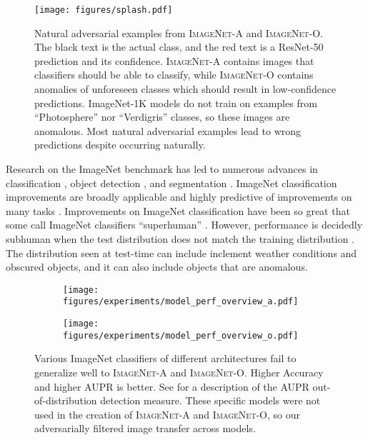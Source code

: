 \documentclass[10pt,twocolumn,letterpaper]{article}
\begin{document}
\begin{figure}[t]
\centering
    \texttt{[image: figures/splash.pdf]}
\caption{Natural adversarial examples from \textsc{ImageNet-A} and \textsc{ImageNet-O}. The black text is the actual class, and the red text is a ResNet-50 prediction and its confidence. \textsc{ImageNet-A} contains images that classifiers should be able to classify, while \textsc{ImageNet-O} contains anomalies of unforeseen classes which should result in low-confidence predictions. ImageNet-1K models do not train on examples from ``Photosphere'' nor ``Verdigris'' classes, so these images are anomalous. Most natural adversarial examples lead to wrong predictions despite occurring naturally.
}\label{fig:splash}
\vspace{-10pt}
\end{figure}

Research on the ImageNet \cite{imagenet} benchmark has led to numerous advances in classification \cite{AlexNet}, object detection \cite{Huang2017SpeedAccuracyTF}, and segmentation \cite{He2018MaskR}. ImageNet classification improvements are broadly applicable and highly predictive of improvements on many tasks \cite{Kornblith2018DoBI}. Improvements on ImageNet classification have been so great that some call ImageNet classifiers ``superhuman'' \cite{He2015DelvingDI}.
However, performance is decidedly subhuman when the test distribution does not match the training distribution \cite{hendrycks2019robustness}. The distribution seen at test-time can include inclement weather conditions and obscured objects, and it can also include objects that are anomalous.

\begin{figure*}[t]
\vspace{-10pt}
\centering
\begin{subfigure}{.5\textwidth}
\texttt{[image: figures/experiments/model\_perf\_overview\_a.pdf]}
\end{subfigure}\begin{subfigure}{.5\textwidth}
\texttt{[image: figures/experiments/model\_perf\_overview\_o.pdf]}
\end{subfigure}
\caption{
Various ImageNet classifiers of different architectures fail to generalize well to \textsc{ImageNet-A} and \textsc{ImageNet-O}.
Higher Accuracy and higher AUPR is better. See  for a description of the AUPR out-of-distribution detection measure. These specific models were not used in the creation of \textsc{ImageNet-A} and \textsc{ImageNet-O}, so our adversarially filtered image transfer across models. 
}\label{fig:modelsono}
\vspace{-10pt}
\end{figure*}
\end{document}
